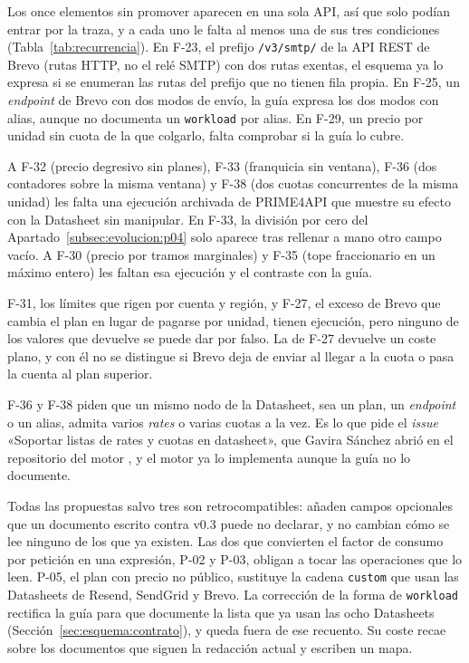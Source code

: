 Los once elementos sin promover aparecen en una sola API, así que solo podían entrar por la traza, y a cada uno le falta al menos una de sus tres condiciones (Tabla~\ref{tab:recurrencia}).
En F-23, el prefijo \texttt{/v3/smtp/} de la API REST de Brevo (rutas HTTP, no el relé SMTP) con dos rutas exentas, el esquema ya lo expresa si se enumeran las rutas del prefijo que no tienen fila propia.
En F-25, un \textit{endpoint} de Brevo con dos modos de envío, la guía expresa los dos modos con alias, aunque no documenta un \texttt{workload} por alias.
En F-29, un precio por unidad sin cuota de la que colgarlo, falta comprobar si la guía lo cubre.

A F-32 (precio degresivo sin planes), F-33 (franquicia sin ventana), F-36 (dos contadores sobre la misma ventana) y F-38 (dos cuotas concurrentes de la misma unidad) les falta una ejecución archivada de PRIME4API que muestre su efecto con la Datasheet sin manipular.
En F-33, la división por cero del Apartado~\ref{subsec:evolucion:p04} solo aparece tras rellenar a mano otro campo vacío.
A F-30 (precio por tramos marginales) y F-35 (tope fraccionario en un máximo entero) les faltan esa ejecución y el contraste con la guía.

F-31, los límites que rigen por cuenta y región, y F-27, el exceso de Brevo que cambia el plan en lugar de pagarse por unidad, tienen ejecución, pero ninguno de los valores que devuelve se puede dar por falso.
La de F-27 devuelve un coste plano, y con él no se distingue si Brevo deja de enviar al llegar a la cuota o pasa la cuenta al plan superior.

F-36 y F-38 piden que un mismo nodo de la Datasheet, sea un plan, un \textit{endpoint} o un alias, admita varios \textit{rates} o varias cuotas a la vez.
Es lo que pide el \textit{issue} «Soportar listas de rates y cuotas en datasheet», que Gavira Sánchez abrió en el repositorio del motor \citep{prime4apirepo}, y el motor ya lo implementa aunque la guía no lo documente.

\label{sec:evolucion:compatibilidad}Todas las propuestas salvo tres son retrocompatibles: añaden campos opcionales que un documento escrito contra v0.3 puede no declarar, y no cambian cómo se lee ninguno de los que ya existen.
Las dos que convierten el factor de consumo por petición en una expresión, P-02 y P-03, obligan a tocar las operaciones que lo leen.
P-05, el plan con precio no público, sustituye la cadena \texttt{custom} que usan las Datasheets de Resend, SendGrid y Brevo.
La corrección de la forma de \texttt{workload} rectifica la guía para que documente la lista que ya usan las ocho Datasheets (Sección~\ref{sec:esquema:contrato}), y queda fuera de ese recuento.
Su coste recae sobre los documentos que siguen la redacción actual y escriben un mapa.

